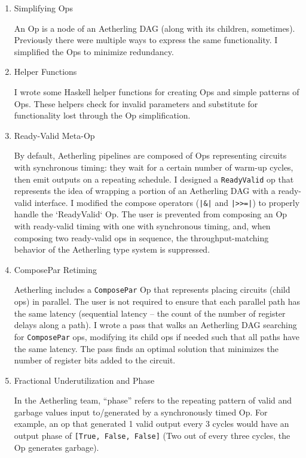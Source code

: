 \documentclass[11pt]{article}
\begin{document}
\begin{enumerate}
\item Simplifying Ops

An Op is a node of an Aetherling DAG (along with its children,
sometimes). Previously there were multiple ways to express the same
functionality. I simplified the Ops to minimize redundancy.

\item Helper Functions

I wrote some Haskell helper functions for creating Ops and simple
patterns of Ops. These helpers check for invalid parameters and
substitute for functionality lost through the Op simplification.

\item Ready-Valid Meta-Op

By default, Aetherling pipelines are composed of Ops representing
circuits with synchronous timing: they wait for a certain number of
warm-up cycles, then emit outputs on a repeating schedule. I designed
a \texttt{ReadyValid} op that represents the idea of wrapping a portion
of an Aetherling DAG with a ready-valid interface.  I modified the
compose operators (\texttt{|\&|} and \texttt{|>>=|}) to properly handle
the `ReadyValid` Op.  The user is prevented from composing an Op with
ready-valid timing with one with synchronous timing, and, when
composing two ready-valid ops in sequence, the throughput-matching
behavior of the Aetherling type system is suppressed.

\item ComposePar Retiming

Aetherling includes a \texttt{ComposePar} Op that represents placing
circuits (child ops) in parallel. The user is not required to ensure
that each parallel path has the same latency (sequential latency --
the count of the number of register delays along a path). I wrote a
pass that walks an Aetherling DAG searching for \texttt{ComposePar}
ops, modifying its child ops if needed such that all paths have the
same latency. The pass finds an optimal solution that minimizes the
number of register bits added to the circuit.

\item Fractional Underutilization and Phase

In the Aetherling team, ``phase'' refers to the repeating pattern of
valid and garbage values input to/generated by a synchronously timed
Op. For example, an op that generated 1 valid output every 3 cycles
would have an output phase of \texttt{[True, False, False]} (Two out
of every three cycles, the Op generates garbage).


\end{enumerate}
\end{document}
